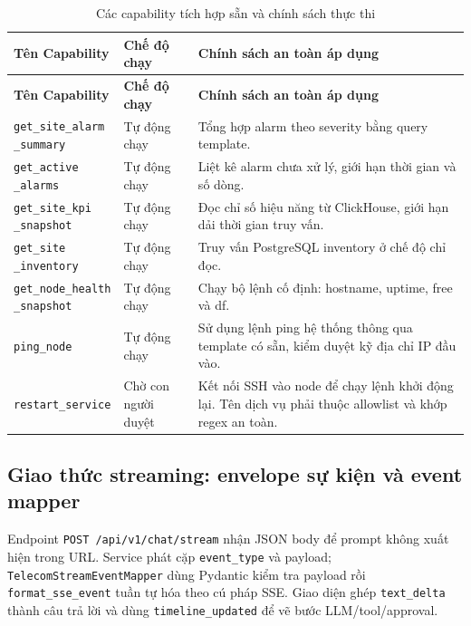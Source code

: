 \documentclass[12pt,a4paper]{article}
\begin{document}
\begin{longtable}{p{}p{}p{}}
\caption{Các capability tích hợp sẵn và chính sách thực thi}\label{tab:capabilities}\\
\toprule
\textbf{Tên Capability} & \textbf{Chế độ chạy} & \textbf{Chính sách an toàn áp dụng} \\
\midrule
\endfirsthead
\toprule
\textbf{Tên Capability} & \textbf{Chế độ chạy} & \textbf{Chính sách an toàn áp dụng} \\
\midrule
\endhead
\shortstack[l]{\texttt{get\_site\_alarm}\\\texttt{\_summary}} & Tự động chạy & Tổng hợp alarm theo severity bằng query template. \\
\shortstack[l]{\texttt{get\_active}\\\texttt{\_alarms}} & Tự động chạy & Liệt kê alarm chưa xử lý, giới hạn thời gian và số dòng. \\
\shortstack[l]{\texttt{get\_site\_kpi}\\\texttt{\_snapshot}} & Tự động chạy & Đọc chỉ số hiệu năng từ ClickHouse, giới hạn dải thời gian truy vấn. \\
\shortstack[l]{\texttt{get\_site}\\\texttt{\_inventory}} & Tự động chạy & Truy vấn PostgreSQL inventory ở chế độ chỉ đọc. \\
\shortstack[l]{\texttt{get\_node\_health}\\\texttt{\_snapshot}} & Tự động chạy & Chạy bộ lệnh cố định: hostname, uptime, free và df. \\
\texttt{ping\_node} & Tự động chạy & Sử dụng lệnh ping hệ thống thông qua template có sẵn, kiểm duyệt kỹ địa chỉ IP đầu vào. \\
\texttt{restart\_service} & Chờ con người duyệt & Kết nối SSH vào node để chạy lệnh khởi động lại. Tên dịch vụ phải thuộc allowlist và khớp regex an toàn. \\
\bottomrule
\end{longtable}

\subsection{Giao thức streaming: envelope sự kiện và event mapper}
Endpoint \texttt{POST /api/v1/chat/stream} nhận JSON body để prompt không xuất hiện trong URL. Service phát cặp \texttt{event\_type} và payload; \texttt{TelecomStreamEventMapper} dùng Pydantic kiểm tra payload rồi \texttt{format\_sse\_event} tuần tự hóa theo cú pháp SSE. Giao diện ghép \texttt{text\_delta} thành câu trả lời và dùng \texttt{timeline\_updated} để vẽ bước LLM/tool/approval.
\end{document}
